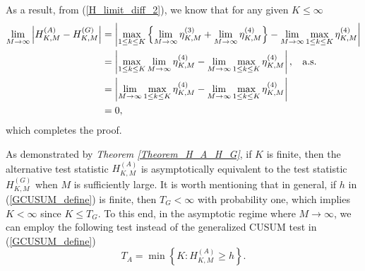 \documentclass[11pt, draftclsnofoot, onecolumn]{IEEEtran}
\begin{document}
\begin{IEEEproof}
As a result, from (\ref{H_limit_diff_2}), we know that for any given $K \le \infty$
\begin{align} \notag
\mathop {\lim }\limits_{M \to \infty } \left| {H_{K,M}^{\left( A \right)} - H_{K,M}^{\left( G \right)}} \right| & = \left| {\mathop {\max }\limits_{1 \le k \le K} \left\{ {\mathop {\lim }\limits_{M \to \infty } \eta _{K,M}^{(3)} + \mathop {\lim }\limits_{M \to \infty } \eta _{K,M}^{(4)}} \right\} - \mathop {\lim }\limits_{M \to \infty } \mathop {\max }\limits_{1 \le k \le K}  \eta _{K,M}^{(4)}} \right|\\ \notag
& = \left| {\mathop {\max }\limits_{1 \le k \le K} \mathop {\lim }\limits_{M \to \infty } \eta _{K,M}^{(4)} - \mathop {\lim }\limits_{M \to \infty } \mathop {\max }\limits_{1 \le k \le K}  \eta _{K,M}^{(4)}} \right|,  \;\; \text{ a.s.}\\  \notag
& = \left|  \mathop {\lim }\limits_{M \to \infty } {\mathop {\max }\limits_{1 \le k \le K} \eta _{K,M}^{(4)} - \mathop {\lim }\limits_{M \to \infty } \mathop {\max }\limits_{1 \le k \le K}  \eta _{K,M}^{(4)}} \right| \\
& = 0,
\end{align}
which completes the proof.
\end{IEEEproof}


As demonstrated by \emph{Theorem \ref{Theorem_H_A_H_G}}, if $K$ is finite, then the alternative test statistic $H_{K,M}^{\left( A \right)}$ is asymptotically equivalent to the test statistic $H_{K,M}^{\left( G \right)}$ when $M$ is sufficiently large. It is worth mentioning that in general, if $h$ in (\ref{GCUSUM_define}) is finite, then $T_G<\infty$ with probability one, which implies $K<\infty$ since $K\le T_G$. To this end, in the asymptotic regime where $M \to \infty$, we can employ the following test instead of the generalized CUSUM test in (\ref{GCUSUM_define})
\begin{equation} \label{Test_Alternative}
{T_A} = \min \left\{ {K:H_{K,M}^{(A)} \ge h} \right\}.
\end{equation}
\end{document}
